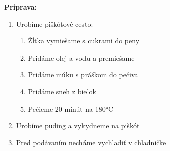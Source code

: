\begin{recipe}
\textbf{ {\normalsize Príprava:} }
\begin{enumerate}

  \item{Urobíme piškótové cesto: }
      \begin{enumerate}
          \item{Žĺtka vymiešame s cukrami do peny}
          \item{Pridáme olej a vodu a premiešame}
          \item{Pridáme múku s práškom do pečiva}
          \item{Pridáme sneh z bielok}
          \item{Pečieme 20 minút na 180°C}\end{enumerate}
  \item{Urobíme puding a vykydneme na piškót}
  \item{Pred podávaním necháme vychladiť v chladničke}

\end{enumerate}
\end{recipe}

\begin{notes}
  
\end{notes}	
\clearpage
